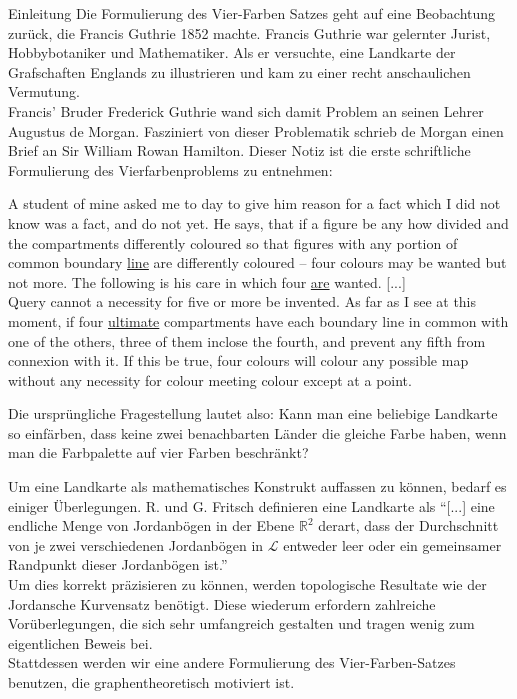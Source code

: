 \begin{chapter}{Einleitung}
 Die Formulierung des Vier-Farben Satzes geht auf eine Beobachtung zurück, die Francis Guthrie 1852 machte. Francis Guthrie war gelernter Jurist, Hobbybotaniker und Mathematiker. Als er versuchte, eine Landkarte der Grafschaften Englands zu illustrieren und kam zu einer recht anschaulichen Vermutung. \\
 Francis' Bruder Frederick Guthrie wand sich damit Problem an seinen Lehrer Augustus de Morgan. Fasziniert von dieser Problematik schrieb de Morgan einen Brief an Sir William Rowan Hamilton. Dieser Notiz ist die erste schriftliche Formulierung des Vierfarbenproblems zu entnehmen:
 
 \begin{satz}
  A student of mine asked me to day to give him reason for a fact which I did not know was a fact, and do not yet. He says, that if a figure be any how divided and the compartments differently coloured so that figures with any portion of common boundary \underline{line} are differently coloured -- four colours may be wanted but not more. The following is his care in which four \underline{are} wanted. [...]\\
  Query cannot a necessity for five or more be invented. As far as I see at this moment, if four \underline{ultimate} compartments have each boundary line in common with one of the others, three of them inclose the fourth, and prevent any fifth from connexion with it. If this be true, four colours will colour any possible map without any necessity for colour meeting colour except at a point.  \cite{fritsch}
 \end{satz}
 
 Die ursprüngliche Fragestellung lautet also: Kann man eine beliebige Landkarte so einfärben, dass keine zwei benachbarten Länder die gleiche Farbe haben, wenn man die Farbpalette auf vier Farben beschränkt?
 
 Um eine Landkarte als mathematisches Konstrukt auffassen zu können, bedarf es einiger Überlegungen. R. und G. Fritsch definieren eine Landkarte als ``[...] eine endliche Menge von Jordanbögen in der Ebene $\mathbb{R}^2$ derart, dass der Durchschnitt von je zwei verschiedenen Jordanbögen in $\mathcal{L}$ entweder leer oder ein gemeinsamer Randpunkt dieser Jordanbögen ist.'' \cite{fritsch}\\
 Um dies korrekt präzisieren zu können, werden topologische Resultate wie der Jordansche Kurvensatz benötigt. Diese wiederum erfordern zahlreiche Vorüberlegungen, die sich sehr umfangreich gestalten und tragen wenig zum eigentlichen Beweis bei. \\
 Stattdessen werden wir eine andere Formulierung des Vier-Farben-Satzes benutzen, die graphentheoretisch motiviert ist. 
 

\end{chapter}
